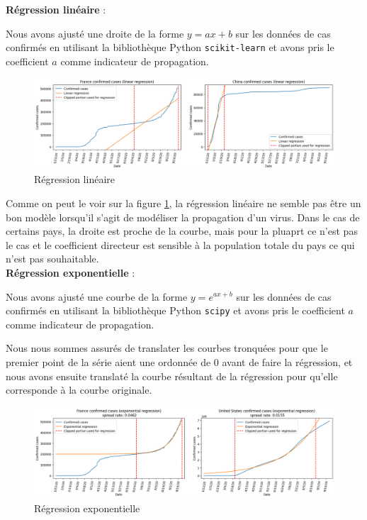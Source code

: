\documentclass[12pt]{iEEEtran}
\begin{document}
\vskip 0.3cm
\noindent\textbf{Régression linéaire} : 

Nous avons ajusté une droite de la forme $y = ax + b$ sur les données de cas confirmés en utilisant
la bibliothèque Python \texttt{scikit-learn} et avons pris le coefficient $a$ comme indicateur de
propagation.

\begin{figure}[h]
    \centering
    \includegraphics[width=\columnwidth]{img/lin_reg.png}
    \caption{Régression linéaire}

    \label{fig:lin_reg}
\end{figure}

Comme on peut le voir sur la figure \ref{fig:lin_reg}, la régression linéaire ne semble pas être un
bon modèle lorsqu'il s'agit de modéliser la propagation d'un virus. Dans le cas de certains pays, la
droite est proche de la courbe, mais pour la pluaprt ce n'est pas le cas et le coefficient directeur
est sensible à la population totale du pays ce qui n'est pas souhaitable.
\\

\noindent\textbf{Régression exponentielle} :

Nous avons ajusté une courbe de la forme $y = e^{ax+b}$ sur les données de cas confirmés en utilisant
la bibliothèque Python \texttt{scipy} et avons pris le coefficient $a$ comme indicateur de propagation.

Nous nous sommes assurés de translater les courbes tronquées pour que le premier point de la série
aient une ordonnée de 0 avant de faire la régression, et nous avons ensuite translaté la courbe
résultant de la régression pour qu'elle corresponde à la courbe originale.

\begin{figure}[h]
    \centering
    \includegraphics[width=\columnwidth]{img/exp_reg.png}
    \caption{Régression exponentielle}

    \label{fig:exp_reg}
\end{figure}
\end{document}
